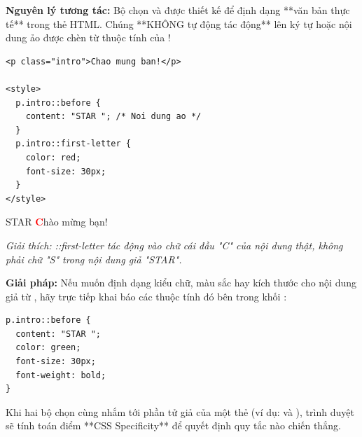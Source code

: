 \begin{conceptBox}
\textbf{Nguyên lý tương tác:} Bộ chọn  và  được thiết kế để định dạng **văn bản thực tế** trong thẻ HTML. Chúng **KHÔNG tự động tác động** lên ký tự hoặc nội dung ảo được chèn từ thuộc tính  của !
\end{conceptBox}

\begin{codeWindow}
\begin{lstlisting}[language=HTML5]
<p class="intro">Chao mung ban!</p>

<style>
  p.intro::before {
    content: "STAR "; /* Noi dung ao */
  }
  p.intro::first-letter {
    color: red;
    font-size: 30px;
  }
</style>
\end{lstlisting}
\end{codeWindow}

\begin{browserWindow}
\sffamily\small
STAR \textbf{\Huge\textcolor{red}{C}}hào mừng bạn! \par\vspace{2pt}
{\scriptsize\textcolor{gray!70}{\textit{Giải thích: ::first-letter tác động vào chữ cái đầu "C" của nội dung thật, không phải chữ "S" trong nội dung giả "STAR".}}}
\end{browserWindow}

\begin{tipBox}
\textbf{Giải pháp:} Nếu muốn định dạng kiểu chữ, màu sắc hay kích thước cho nội dung giả từ , hãy trực tiếp khai báo các thuộc tính đó bên trong khối :
\begin{codeWindow}
\begin{lstlisting}[language=CSS3]
p.intro::before {
  content: "STAR ";
  color: green;
  font-size: 30px;
  font-weight: bold;
}
\end{lstlisting}
\end{codeWindow}
\end{tipBox}

\begin{conceptBox}
Khi hai bộ chọn cùng nhắm tới phần tử giả của một thẻ (ví dụ:  và ), trình duyệt sẽ tính toán điểm **CSS Specificity** để quyết định quy tắc nào chiến thắng.
\end{conceptBox}

